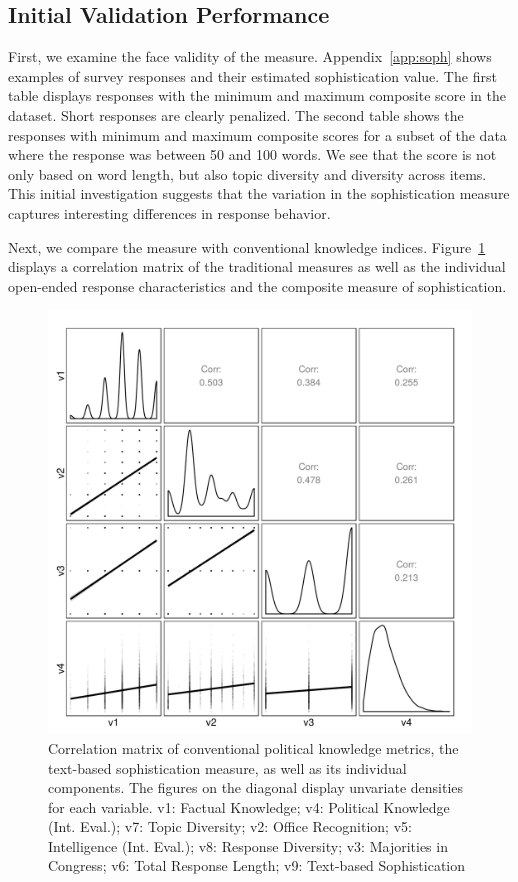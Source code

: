 \documentclass[12pt]{article}
\begin{document}
\subsection{Initial Validation Performance}

First, we examine the face validity of the measure. Appendix~\ref{app:soph} shows examples of survey responses and their estimated sophistication value. The first table displays responses with the minimum and maximum composite score in the dataset.  Short responses are clearly penalized. The second table shows the responses with minimum and maximum composite scores for a subset of the data where the response was between 50 and 100 words. We see that the score is not only based on word length, but also topic diversity and diversity across items. This initial investigation suggests that the variation in the sophistication measure captures interesting differences in response behavior.

Next, we compare the measure with conventional knowledge indices. Figure~\ref{fig:corr} displays a correlation matrix of the traditional measures as well as the individual open-ended response characteristics and the composite measure of sophistication.

\begin{figure}[h]\centering
\includegraphics[width=.5\textwidth]{../fig/corplot.png}
\caption{Correlation matrix of conventional political knowledge metrics, the text-based sophistication measure, as well as its individual components. The figures on the diagonal display unvariate densities for each variable. v1: Factual Knowledge; v4: Political Knowledge (Int. Eval.); v7: Topic Diversity; v2: Office Recognition; v5: Intelligence (Int. Eval.); v8: Response Diversity; v3: Majorities in Congress; v6: Total Response Length; v9: Text-based Sophistication}\label{fig:corr}
\end{figure}
\end{document}
